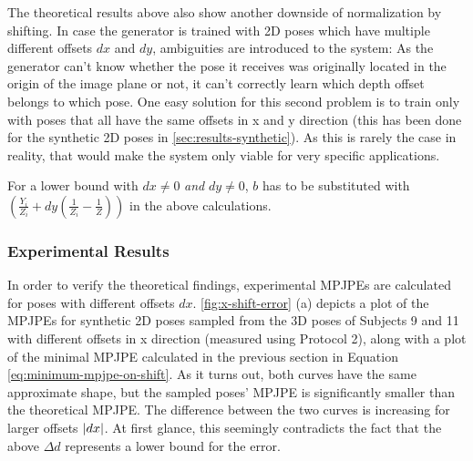 The theoretical results above also show another downside of normalization by shifting.
In case the generator is trained with 2D poses which have multiple different offsets $dx$ and $dy$, ambiguities are introduced to the system:
As the generator can't know whether the pose it receives was originally located in the origin of the image plane or not, it can't correctly learn which depth offset belongs to which pose.
One easy solution for this second problem is to train only with poses that all have the same offsets in x and y direction (this has been done for the synthetic 2D poses in \autoref{sec:results-synthetic}).
As this is rarely the case in reality, that would make the system only viable for very specific applications.

For a lower bound with $dx \neq 0$ \emph{and} $dy \neq 0$, $b$ has to be substituted with $\left( \frac{Y_i}{Z_i} + dy \left( \frac{1}{Z_i} - \frac{1}{Z} \right) \right )$ in the above calculations.

\subsubsection{Experimental Results}

In order to verify the theoretical findings, experimental MPJPEs are calculated for poses with different offsets $dx$.
\autoref{fig:x-shift-error} (a) depicts a plot of the MPJPEs for synthetic 2D poses sampled from the 3D poses of Subjects 9 and 11 with different offsets in x direction (measured using Protocol 2), along with a plot of the minimal MPJPE calculated in the previous section in Equation \eqref{eq:minimum-mpjpe-on-shift}.
As it turns out, both curves have the same approximate shape, but the sampled poses' MPJPE is significantly smaller than the theoretical MPJPE.
The difference between the two curves is increasing for larger offsets $\abs{dx}$.
At first glance, this seemingly contradicts the fact that the above $\Delta d$ represents a lower bound for the error.

